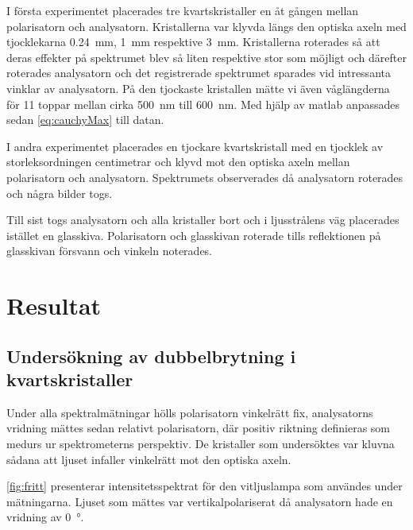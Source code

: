 \documentclass[a4paper]{article}
\begin{document}
  I första experimentet placerades tre kvartskristaller en åt gången mellan polarisatorn och analysatorn. Kristallerna var klyvda längs den optiska axeln med tjocklekarna \SI{0.24}{\milli\meter}, \SI{1}{\milli\meter} respektive \SI{3}{\milli\meter}. Kristallerna roterades så att deras effekter på spektrumet blev så liten respektive stor som möjligt och därefter roterades analysatorn och det registrerade spektrumet sparades vid intressanta vinklar av analysatorn. På den tjockaste kristallen mätte vi även våglängderna för 11 toppar mellan cirka \SI{500}{\nano\meter} till \SI{600}{\nano\meter}. Med hjälp av matlab anpassades sedan \eqref{eq:cauchyMax} till datan.
  
  I andra experimentet placerades en tjockare kvartskristall med en tjocklek av storleksordningen centimetrar och klyvd mot den optiska axeln mellan polarisatorn och analysatorn. Spektrumets observerades då analysatorn roterades och några bilder togs.
  
  Till sist togs analysatorn och alla kristaller bort och i ljusstrålens väg placerades istället en glasskiva. Polarisatorn och glasskivan roterade tills reflektionen på glasskivan försvann och vinkeln noterades.

\section{Resultat}

\subsection{Undersökning av dubbelbrytning i kvartskristaller}

Under alla spektralmätningar hölls polarisatorn vinkelrätt fix, analysatorns vridning mättes sedan relativt polarisatorn, där positiv riktning definieras som medurs ur spektrometerns perspektiv. De kristaller som undersöktes var kluvna sådana att ljuset infaller vinkelrätt mot den optiska axeln.

\FloatBarrier
\autoref{fig:fritt} presenterar intensitetsspektrat för den vitljuslampa som användes under mätningarna. Ljuset som mättes var vertikalpolariserat då analysatorn hade en vridning av \SI{0}{\degree}.
\end{document}
